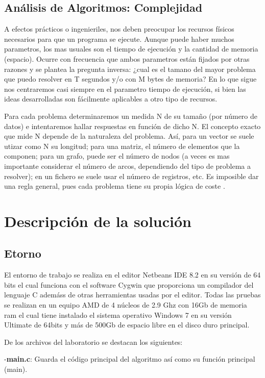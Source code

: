 \documentclass[9pt,twocolumn,twoside]{optica}
\begin{document}
\subsection{Análisis de Algoritmos: Complejidad}
 A efectos prácticos o ingenieriles, nos deben preocupar los recursos físicos necesarios para que un programa se ejecute. Aunque puede haber muchos parametros, los mas usuales son el tiempo de ejecución y la cantidad de memoria (espacio). Ocurre con frecuencia que ambos parametros están fijados por otras razones y se plantea la pregunta inversa: ¿cual es el tamano del mayor problema que puedo resolver en T segundos y/o con M bytes de memoria? En lo que sigue nos centraremos casi siempre en el parametro tiempo de ejecución, si bien las ideas desarrolladas son fácilmente aplicables a otro tipo de recursos.

Para cada problema determinaremos un medida N de su tamaño (por número de datos) e intentaremos hallar respuestas en función de dicho N. El concepto exacto que mide N depende de la naturaleza del problema. Así, para un vector se suele utizar como N su longitud; para una matriz, el número de elementos que la componen; para un grafo, puede ser el número de nodos (a veces es mas importante considerar el número de arcos, dependiendo del tipo de problema a resolver); en un fichero se suele usar el número de registros, etc. Es imposible dar una regla general, pues cada problema tiene su propia lógica de coste  \cite{complejidad}.

\section{Descripción de la solución}
\subsection{Etorno}
El entorno de trabajo se realiza en el editor Netbeans IDE 8.2 en su versión de 64 bits el cual funciona con el software Cygwin que proporciona un compilador del lenguaje C ademáss de otras herramientas usadas por el editor.
Todas las pruebas se realizan en un equipo AMD de 4 núcleos de 2.9 Ghz con 16Gb de memoria ram el cual tiene instalado el sistema operativo Windows 7 en su versión Ultimate de 64bits y más de 500Gb de espacio libre en el disco duro principal.

De los archivos del laboratorio se destacan los siguientes:

-\textbf{main.c}: Guarda el código principal del algoritmo así como su función principal (main).
\end{document}
